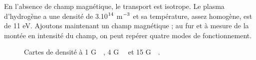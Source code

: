 \begin{refsection}
En l'absence de champ magnétique, le transport est isotrope. Le plasma
d'hydrogène a une densité de 3.10$^{{14}}$ m$^{{-3}}$ et sa
température, assez homogène, est de 11 eV. Ajoutons maintenant un champ
magnétique ; au fur et à mesure de la montée en intensité du champ, on peut
repérer quatre modes de fonctionnement.

\begin{figure}[!htb]
  \centering
    \caption{Cartes de densité à 1 G~~, 4
    G~~ et 15 G~~.}
    \label{4-CybeleVarMag-1}
\end{figure}


\end{refsection}
